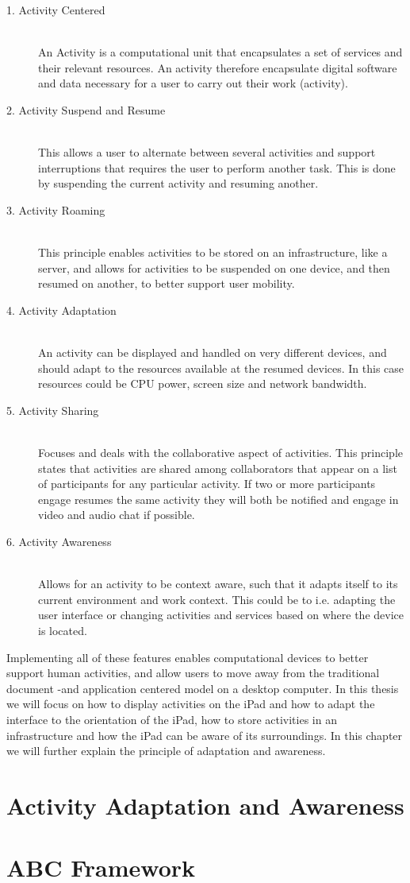 \begin{description}

	\item[1. Activity Centered] \hfill \\
	An Activity is a computational unit that encapsulates a set of services and their relevant resources. An activity therefore encapsulate digital software and data necessary for a user to carry out their work (activity).
	
	\item[2. Activity Suspend and Resume] \hfill \\
	This allows a user to alternate between several activities and support interruptions that requires the user to perform another task. This is done by suspending the current activity and resuming another.
	
	\item[3. Activity Roaming] \hfill \\
	This principle enables activities to be stored on an infrastructure, like a server, and allows for activities to be suspended on one device, and then resumed on another, to better support user mobility.
	
	\item[4. Activity Adaptation] \hfill \\
	An activity can be displayed and handled on very different devices, and should adapt to the resources available at the resumed devices. In this case resources could be CPU power, screen size and network bandwidth.
	
	\item[5. Activity Sharing] \hfill \\
	Focuses and deals with the collaborative aspect of activities. This principle states that activities are shared among collaborators that appear on a list of participants for any particular activity. If two or more participants engage resumes the same activity they will both be notified and engage in video and audio chat if possible.
		
	\item[6. Activity Awareness] \hfill \\
	Allows for an activity to be context aware, such that it adapts itself to its current environment and work context. This could be to i.e. adapting the user interface or changing activities and services based on where the device is located.

\end{description}

Implementing all of these features enables computational devices to better support human activities, and allow users to move away from the traditional document -and application centered model on a desktop computer. In this thesis we will focus on how to display activities on the iPad and how to adapt the interface to the orientation of the iPad, how to store activities in an infrastructure and how the iPad can be aware of its surroundings. In this chapter we will further explain the principle of adaptation and awareness.

\section{Activity Adaptation and Awareness}


\section{ABC Framework}

